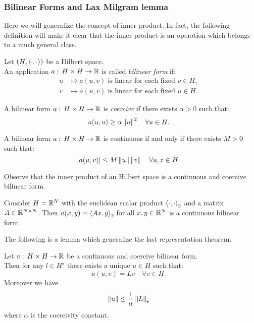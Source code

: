 \subsubsection{Bilinear Forms and Lax Milgram lemma}
Here we will generalize the concept of inner product. In fact, the following definition will make it clear that the inner product is an operation which belongs to a much general class.

\begin{defn}
	Let $(H, \left\langle\cdot, \cdot\right\rangle)$ be a Hilbert space.\\
	An application $a: \, H \times H \to \mathbb R$ is called \emph{bilinear form} if:
	\begin{align*}
		u &\mapsto a(u,v) \text{ is linear for each fixed } v \in H,\\
		v &\mapsto a(u,v) \text{ is linear for each fixed } u \in H.
	\end{align*}
\end{defn}

\begin{defn}
	A bilinear form $a: \, H \times H \to \mathbb R$ is \emph{coercive} if there exists $\alpha > 0$ such that:
	$$a(u,u) \geq \alpha\left\lVert u\right\rVert^2 \quad \forall u \in H.$$
\end{defn}

\begin{prop}
	A bilinear form $a: \, H \times H \to \mathbb R$ is continuous if and only if there exists $M > 0$ such that:
	$$ \left\lvert a(u,v)\right\rvert \leq M\left\lVert u\right\rVert\left\lVert v\right\rVert \quad \forall u, v \in H.$$
\end{prop}

Observe that the inner product of an Hilbert space is a continuous and coercive bilinear form.

Consider $H = \mathbb R^N$ with the euclidean scalar product $\left\langle\cdot, \cdot\right\rangle_2$ and a matrix $A \in \mathbb R^{N \times N}$.
Then $a(x,y) = \left\langle Ax, y\right\rangle_2$ for all $x, y \in \mathbb R^N$ is a continuous bilinear form.

The following is a lemma which generalize the last representation theorem.

\begin{theo}\label{theo-lax-milgram}
	Let $a:\, H \times H \to \mathbb R$ be a continuous and coercive bilinear form.\\
	Then for any $l \in H^\star$ there exists a unique $u \in H$ such that:
	$$a(u,v) = Lv \quad \forall v \in H.$$
	Moreover we have
	$$\left\lVert u\right\rVert \leq \frac{1}{\alpha}\left\lVert L\right\rVert_\star$$
	where $\alpha$ is the coercivity constant.
\end{theo}

